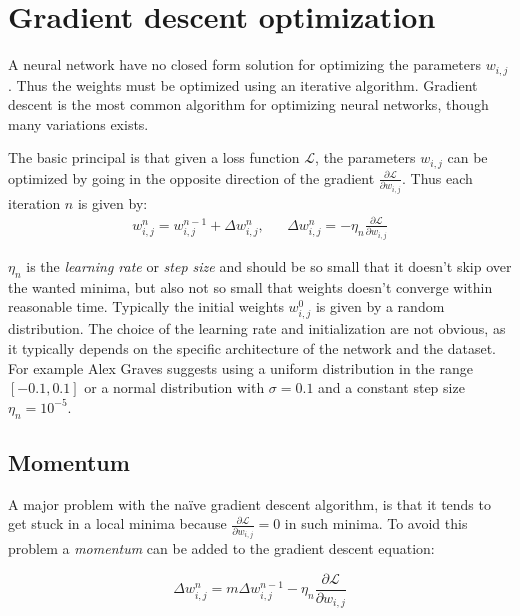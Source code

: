 \section{Gradient descent optimization}

A neural network have no closed form solution for optimizing the parameters $w_{i,j}$. Thus the weights must be optimized using an iterative algorithm. Gradient descent is the most common algorithm for optimizing neural networks, though many variations exists.

The basic principal is that given a loss function $\mathcal{L}$, the parameters $w_{i,j}$ can be optimized by going in the opposite direction of the gradient $\frac{\partial \mathcal{L}}{\partial w_{i,j}}$. Thus each iteration $n$ is given by:
\begin{equation}
\begin{aligned}
w_{i,j}^n = w_{i,j}^{n-1} + \Delta w_{i,j}^n, && \Delta w_{i,j}^n = - \eta_n \frac{\partial \mathcal{L}}{\partial w_{i,j}}
\end{aligned}
\end{equation}

$\eta_n$ is the \textit{learning rate} or \textit{step size} and should be so small that it doesn't skip over the wanted minima, but also not so small that weights doesn't converge within reasonable time. Typically the initial weights $w^0_{i,j}$ is given by a random distribution. The choice of the learning rate and initialization are not obvious, as it typically depends on the specific architecture of the network and the dataset. For example Alex Graves \cite{alexgraves} suggests using a uniform distribution in the range $[-0.1, 0.1]$ or a normal distribution with $\sigma = 0.1$ and a constant step size $\eta_n = 10^{-5}$.

\subsection{Momentum}

A major problem with the naïve gradient descent algorithm, is that it tends to get stuck in a local minima because $\frac{\partial \mathcal{L}}{\partial w_{i,j}} = 0$ in such minima. To avoid this problem a \textit{momentum} can be added to the gradient descent equation:

\begin{equation}
\Delta w_{i,j}^n = m \Delta w_{i,j}^{n-1} - \eta_n \frac{\partial \mathcal{L}}{\partial w_{i,j}}
\end{equation}

